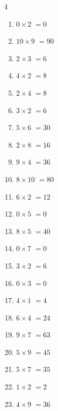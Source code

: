 \begin{multicols}{4}
\begin{enumerate}
  \item $0\times 2$
        $=0$

  \item $10\times 9$
        $=90$

  \item $2\times 3$
        $=6$

  \item $4\times 2$
        $=8$

  \item $2\times 4$
        $=8$

  \item $3\times 2$
        $=6$

  \item $5\times 6$
        $=30$

  \item $2\times 8$
        $=16$

  \item $9\times 4$
        $=36$

  \item $8\times 10$
        $=80$

  \item $6\times 2$
        $=12$

  \item $0\times 5$
        $=0$

  \item $8\times 5$
        $=40$

  \item $0\times 7$
        $=0$

  \item $3\times 2$
        $=6$

  \item $0\times 3$
        $=0$

  \item $4\times 1$
        $=4$

  \item $6\times 4$
        $=24$

  \item $9\times 7$
        $=63$

  \item $5\times 9$
        $=45$

  \item $5\times 7$
        $=35$

  \item $1\times 2$
        $=2$

  \item $4\times 9$
        $=36$


\end{enumerate}
\end{multicols}
